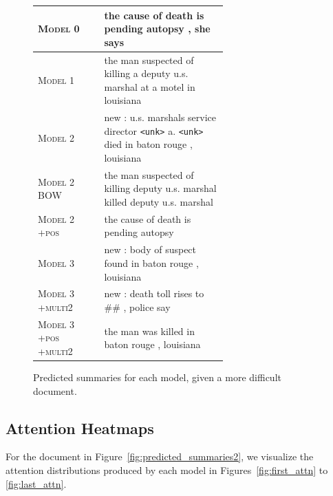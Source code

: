 \documentclass[12pt]{report}
\begin{document}
\begin{figure}[p]
\begin{tabular}{ll p{0.65\linewidth}}
\textsc{Model 0} & & the cause of death is pending autopsy , she says \\
\midrule
 \textsc{Model 1} & & the man suspected of killing a deputy u.s. marshal at a motel in louisiana \\
\midrule
\textsc{Model 2 } & & new : u.s. marshals service director \texttt{<unk>} a. \texttt{<unk>} died in baton rouge , louisiana \\
\textsc{Model 2 BOW} & &  the man suspected of killing deputy u.s. marshal killed deputy u.s. marshal \\
\textsc{Model 2 +pos} & & the cause of death is pending autopsy \\
\midrule
\textsc{Model 3 } & & new : body of suspect found in baton rouge , louisiana \\
\textsc{Model 3 +multi2} & &  new : death toll rises to \#\# , police say \\
\textsc{Model 3 +pos +multi2} & & the man was killed in baton rouge , louisiana \\
\bottomrule
\end{tabular}
\caption[Predicted Summaries 3]{Predicted summaries for each model, given a more difficult document.}
\label{fig:predicted_summaries3}
\end{figure}


\pagebreak

\subsection{Attention Heatmaps}
\label{sec:attn}

For the document in Figure~\ref{fig:predicted_summaries2}, we visualize the attention distributions produced by each model in Figures~\ref{fig:first_attn} to \ref{fig:last_attn}.
\end{document}
